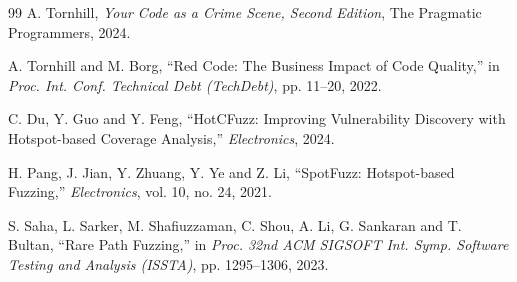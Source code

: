 \begin{thebibliography}{99}
A. Tornhill,
\textit{Your Code as a Crime Scene, Second Edition},
The Pragmatic Programmers, 2024.

A. Tornhill and M. Borg,
``Red Code: The Business Impact of Code Quality,''
in \textit{Proc. Int. Conf. Technical Debt (TechDebt)}, pp. 11--20, 2022.

C. Du, Y. Guo and Y. Feng,
``HotCFuzz: Improving Vulnerability Discovery with Hotspot-based Coverage Analysis,''
\textit{Electronics}, 2024.

H. Pang, J. Jian, Y. Zhuang, Y. Ye and Z. Li,
``SpotFuzz: Hotspot-based Fuzzing,''
\textit{Electronics}, vol. 10, no. 24, 2021.

S. Saha, L. Sarker, M. Shafiuzzaman, C. Shou, A. Li, G. Sankaran and T. Bultan,
``Rare Path Fuzzing,''
in \textit{Proc. 32nd ACM SIGSOFT Int. Symp. Software Testing and Analysis (ISSTA)}, pp. 1295--1306, 2023.

\end{thebibliography}
